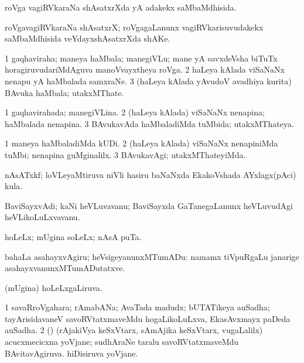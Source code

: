 \bentry
{}
\gl{\gu}
\bmng
roVga vagiRVkaraNa shAsatxrXda yA adakekx saMbaMdhisida. 
\emng
\eentry

\bentry
{}
\gl{\nA}
\bmng
roVgavagiRVkaraNa shAsatxrX; roVgagaLanunx vagiRVkarisuvudakekx saMbaMdhisida veYdayxshAsatxrXda shAKe. 
\emng
\eentry

\bentry
{}
\gl{\nA}
\bmng
\bnum
\num{1} gaqhaviraha; maneya haMbala; manegiVLu; mane yA savxdeVsha biTuTx horagiruvudariMdAguva manoVvayxtheya roVga. 
\num{2} haLeya kAlada viSaNaNx nenapu yA haMbalada samxraNe. 
\num{3} (haLeya kAlada yAvudoV avadhiya kurita) BAvuka haMbala; utakxMThate. 
\enum
\emng
\eentry

\bentry
{}
\gl{\gu}
\bmng
\bnum
\num{1} gaqhavirahada; manegiVLina. 
\num{2} (haLeya kAlada) viSaNaNx nenapina; haMbalada nenapina. 
\num{3} BAvukavAda haMbaladiMda tuMbida; utakxMThateya. 
\enum
\emng
\eentry

\bentry
{}
\gl{\kirxvi}
\bmng
\bnum
\num{1} maneya haMbaladiMda kUDi. 
\num{2} (haLeya kAlada) viSaNaNx nenapiniMda tuMbi; nenapina guMginalilx. 
\num{3} BAvukavAgi; utakxMThateyiMda. 
\enum
\emng
\eentry

\bentry
{}
\gl{\nA}
\bmng
nAsATxkf; loVLeyaMtiruva niVli hasiru baNaNxda EkakoVshada AYxlagx(pAci) kula. 
\emng
\eentry

\bentry
{}
\gl{\nA}
\bmng
BaviSayxvAdi; kaNi heVLuvavanu; BaviSayxda GaTanegaLanunx heVLuvudAgi heVLikoLuLxvavanu. 
\emng
\eentry

\bentry
{}
\gl{\nA}
\bmng
hoLeLx; mUgina soLeLx; nAsA puTa. 
\emng

\noindent
\gl{\pagu}
\bmng
{}  bahaLa asahayxvAgiru; heVsigeyanunxMTumADu:  namamx tiVpuRgaLu janarige asahayxvanunxMTumADutatxve. 
\emng
\eentry

\bentry
{}
\gl{\gu}
\bmng
(mUgina) hoLeLxgaLiruva. 
\emng
\eentry

\bentry
{}
\gl{\nA}
\bmng
\bnum
\num{1} savaRroVgahara; rAmabANa; AvaTada madudx; bUTATikeya auSadha; tayArisidavaneV savoRVtatxmaveMdu hogaLikoLuLxva, EkasAvxmayx paDeda auSadha. 
\num{2} (\rUpa) (rAjakiVya keSxVtarx, sAmAjika keSxVtarx, \mo vugaLalilx) acucxmecicxna yoVjane; sudhAraNe taralu savoRVtatxmaveMdu BAvitavAgiruva. hiDisiruva yoVjane. 
\enum
\emng
\eentry

